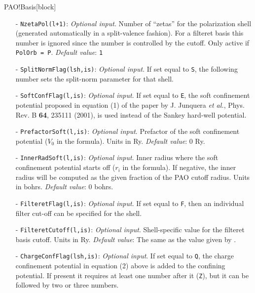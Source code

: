 \begin{fdfentry}{PAO!Basis}[block]
\begin{itemize}
    \item[-]%
    \texttt{NzetaPol(l+1)}: \textit{Optional input}. Number of
    ``zetas'' for the polarization shell (generated automatically in a
    split-valence fashion).  For a filteret basis this number is
    ignored since the number is controlled by the cutoff.  Only active
    if \texttt{PolOrb = P}. \textit{Default value}: \texttt{1}

    \item[-]%
    \texttt{SplitNormFlag(lsh,is)}:
    \textit{Optional input}. If set equal to \texttt{S}, the following
    number sets the split-norm parameter for that shell.

    \item[-]%
    \texttt{SoftConfFlag(l,is)}: \textit{Optional input}. If set equal to
    \texttt{E}, the soft confinement potential proposed in equation
    (1) of the paper by J. Junquera \textit{et al.}, Phys. Rev. B
    \textbf{64}, 235111 (2001), is used instead of the Sankey
    hard-well potential.

    \item[-]%
    \texttt{PrefactorSoft(l,is)}: \textit{Optional input}. Prefactor
    of the soft confinement potential ($V_{0}$ in the formula). Units
    in Ry.  \textit{Default value}: 0 Ry.

    \item[-]%
    \texttt{InnerRadSoft(l,is)}: \textit{Optional input}. Inner radius
    where the soft confinement potential starts off ($r_{i}$ in the
    formula).  If negative, the inner radius will be computed as the
    given fraction of the PAO cutoff radius.  Units in
    bohrs. \textit{Default value}: 0 bohrs.

    \item[-]%
    \texttt{FilteretFlag(l,is)}:
    \textit{Optional input}. If set equal to \texttt{F}, then an
    individual filter cut-off can be specified for the shell.

    \item[-]%
    \texttt{FilteretCutoff(l,is)}: \textit{Optional
        input}. Shell-specific value for the filteret basis
    cutoff. Units in Ry.  \textit{Default value}: The same as the
    value given by .

    \item[-]%
    \texttt{ChargeConfFlag(lsh,is)}: \textit{Optional input}. If set
    equal to \texttt{Q}, the charge confinement potential in equation
    (2) above is added to the confining potential. If present it
    requires at least one number after it (\texttt{Z}), but it can be
    followed by two or three numbers.  


\end{itemize}
\end{fdfentry}
